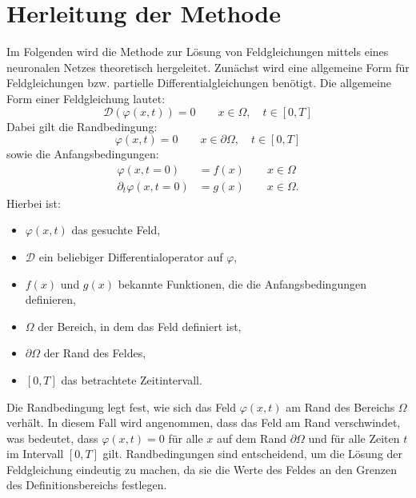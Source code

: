 %
%
%
%

\section{Herleitung der Methode\label{neuronal:section:herleitung}}

Im Folgenden wird die Methode zur Lösung von Feldgleichungen mittels eines neuronalen Netzes theoretisch hergeleitet.
Zunächst wird eine allgemeine Form für Feldgleichungen bzw. partielle Differentialgleichungen benötigt.
Die allgemeine Form einer Feldgleichung lautet:
\begin{equation}
\mathcal{D}(\varphi(x, t)) = 0 \qquad x \in \Omega, \quad t \in [0,T]
\label{neuronal:generelle_feldgleichung}
\end{equation}
Dabei gilt die Randbedingung:
\begin{equation}
\varphi(x, t) = 0 \qquad x \in \partial \Omega, \quad t \in [0,T]
\end{equation}
sowie die Anfangsbedingungen:
\begin{equation}
    \begin{aligned}
        \varphi(x, t = 0) &= f(x) \qquad x \in \Omega \\
        \partial_t \varphi(x, t = 0) &= g(x) \qquad x \in \Omega.
    \end{aligned}
\end{equation}
Hierbei ist:
\begin{itemize}
    \item $\varphi(x, t)$ das gesuchte Feld,
    \item $\mathcal{D}$ ein beliebiger Differentialoperator auf $\varphi$,
    \item $f(x)$ und $g(x)$ bekannte Funktionen, die die Anfangsbedingungen definieren,
    \item $\Omega$ der Bereich, in dem das Feld definiert ist,
    \item $\partial \Omega$ der Rand des Feldes,
    \item $[0,T]$ das betrachtete Zeitintervall.
\end{itemize}

Die Randbedingung legt fest, wie sich das Feld $\varphi(x, t)$ am Rand des Bereichs $\Omega$ verhält.
In diesem Fall wird angenommen, dass das Feld am Rand verschwindet, was bedeutet, dass $\varphi(x, t) = 0$ für alle $x$ auf dem Rand $\partial \Omega$ und für alle Zeiten $t$ im Intervall $[0,T]$ gilt.
Randbedingungen sind entscheidend, um die Lösung der Feldgleichung eindeutig zu machen, da sie die Werte des Feldes an den Grenzen des Definitionsbereichs festlegen.


